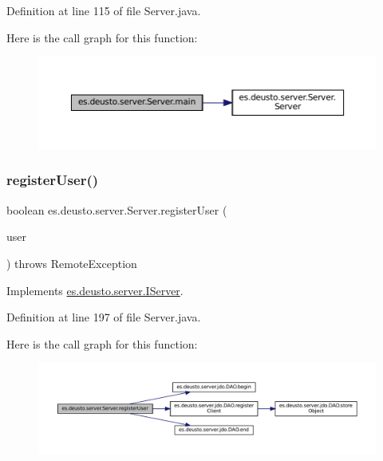 Definition at line 115 of file Server.\+java.

Here is the call graph for this function\+:
\nopagebreak
\begin{figure}[H]
\begin{center}
\leavevmode
\includegraphics[width=350pt]{classes_1_1deusto_1_1server_1_1_server_a750bb0d7dbd89246a3602f2e20d03fb5_cgraph}
\end{center}
\end{figure}
\mbox{\label{classes_1_1deusto_1_1server_1_1_server_a6a419bd82bce60f072b4c7f5a527abdc}} 
\subsubsection{\texorpdfstring{registerUser()}{registerUser()}}
{\footnotesize\ttfamily boolean es.\+deusto.\+server.\+Server.\+register\+User (\begin{DoxyParamCaption}\item[{\mbox{\hyperlink{classes_1_1deusto_1_1server_1_1data_1_1_user_details_d_t_o}{User\+Details\+D\+TO}}}]{user }\end{DoxyParamCaption}) throws Remote\+Exception}



Implements \mbox{\hyperlink{interfacees_1_1deusto_1_1server_1_1_i_server_a998e20655e760b135fab601a417aa5ae}{es.\+deusto.\+server.\+I\+Server}}.



Definition at line 197 of file Server.\+java.

Here is the call graph for this function\+:
\nopagebreak
\begin{figure}[H]
\begin{center}
\leavevmode
\includegraphics[width=350pt]{classes_1_1deusto_1_1server_1_1_server_a6a419bd82bce60f072b4c7f5a527abdc_cgraph}
\end{center}
\end{figure}
\mbox{\label{classes_1_1deusto_1_1server_1_1_server_a16789cc76edd46978ffbb58581caf5db}} 
